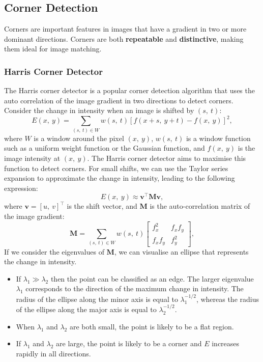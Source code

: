 \documentclass{article}
\begin{document}
\subsection{Corner Detection}
Corners are important features in images that have a gradient in two or
more dominant directions. Corners are both \textbf{repeatable} and
\textbf{distinctive}, making them ideal for image matching.
\subsubsection{Harris Corner Detector}
The Harris corner detector is a popular corner detection algorithm that
uses the auto correlation of the image gradient in two directions to
detect corners. Consider the change in intensity when an image is
shifted by \(\left( s,\: t \right)\):
\begin{equation*}
    E\left( x,\: y \right) = \sum_{\left( s,\: t \right) \in W} w\left( s,\: t \right) \left[ f\left( x + s,\: y + t \right) - f\left( x,\: y \right) \right]^2,
\end{equation*}
where \(W\) is a window around the pixel \(\left( x,\: y \right)\),
\(w\left( s,\: t \right)\) is a window function such as a uniform weight
function or the Gaussian function, and \(f\left( x,\: y \right)\) is the
image intensity at \(\left( x,\: y \right)\). The Harris corner detector
aims to maximise this function to detect corners. For small shifts, we
can use the Taylor series expansion to approximate the change in
intensity, leading to the following expression:
\begin{equation*}
    E\left( x,\: y \right) \approx \symbf{v}^\top \symbf{M} \symbf{v},
\end{equation*}
where \(\symbf{v} = \left[ u,\: v \right]^\top\) is the shift vector,
and \(\symbf{M}\) is the auto-correlation matrix of the image gradient:
\begin{equation*}
    \symbf{M} = \sum_{\left( s,\: t \right) \in W} w\left( s,\: t \right)
    \begin{bmatrix}
        f_x^2 & f_x f_y \\ f_x f_y & f_y^2
    \end{bmatrix}
    ,
\end{equation*}
If we consider the eigenvalues of \(\symbf{M}\), we can visualise an
ellipse that represents the change in intensity.
\begin{itemize}
    \item If \(\lambda_1 \gg \lambda_2\) then the point can be
          classified as an edge. The larger eigenvalue \(\lambda_1\)
          corresponds to the direction of the maximum change in
          intensity. The radius of the ellipse along the minor axis is
          equal to \(\lambda_1^{-1/2}\), whereas the radius of the
          ellipse along the major axis is equal to
          \(\lambda_2^{-1/2}\).
    \item When \(\lambda_1\) and \(\lambda_2\) are both small, the
          point is likely to be a flat region.
    \item If \(\lambda_1\) and \(\lambda_2\) are large, the point is
          likely to be a corner and \(E\) increases rapidly in all
          directions.
\end{itemize}
\end{document}
